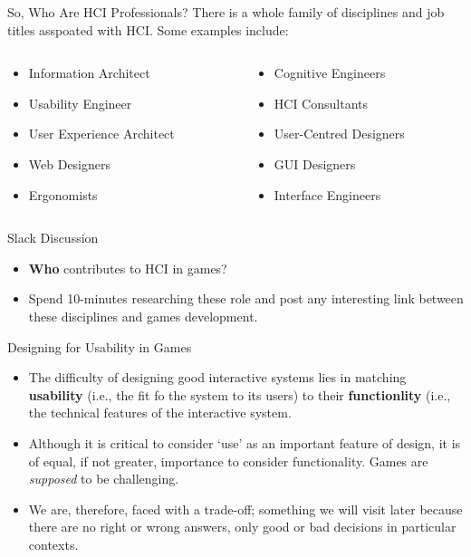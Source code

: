 \begin{frame}{So, Who Are HCI Professionals?}
	There is a whole family of disciplines and job titles asspoated with HCI. Some examples include:

	\begin{columns}[onlytextwidth]
		\begin{column}{0.45\textwidth}
			\begin{itemize}
				\item Information Architect
				\item Usability Engineer
				\item User Experience Architect
				\item Web Designers
				\item Ergonomists
			\end{itemize}
		\end{column}
		\begin{column}{0.45\textwidth}
			\begin{itemize}
				\item Cognitive Engineers
				\item HCI Consultants
				\item User-Centred Designers
				\item GUI Designers
				\item Interface Engineers
			\end{itemize}
		\end{column}
	\end{columns}
\end{frame}

\begin{frame}[fragile]{Slack Discussion}
	\begin{itemize}
		\item \textbf{Who} contributes to HCI in games? 
		
		\vspace{2ex}
		
		\item Spend 10-minutes researching these role and post any interesting link between these disciplines and games development.
	\end{itemize}
\end{frame}

\begin{frame}{Designing for Usability in Games}
	\begin{itemize}
		\item The difficulty of designing good interactive systems lies in matching \textbf{usability} (i.e., the fit fo the system to its users) to their
		\textbf{functionlity} (i.e., the technical features of the interactive system.
		\item Although it is critical to consider `use' as an important feature of design, it is of equal, if not greater, importance to consider
		functionality. Games are \textit{supposed} to be challenging.
		\item We are, therefore, faced with a trade-off; something we will visit later because there are no right or wrong answers, only
		good or bad decisions in particular contexts.
	\end{itemize}
\end{frame}

